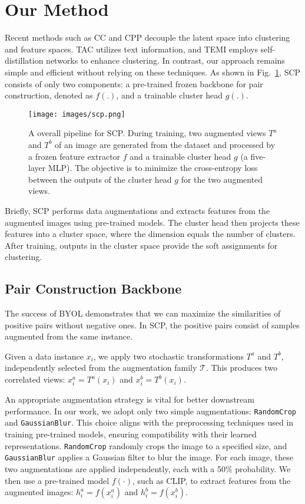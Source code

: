 \section{Our Method}
\label{sec:Our Method}
Recent methods such as CC \cite{li2021contrastive} and CPP \cite{chu2024image} decouple the latent space into clustering and feature spaces. TAC \cite{li2023image} utilizes text information, and TEMI \cite{adaloglou2023exploring} employs self-distillation networks to enhance clustering. In contrast, our approach remains simple and efficient without relying on these techniques. As shown in Fig.~\ref{fig:AE}, SCP consists of only two components: a pre-trained frozen backbone for pair construction, denoted as $f(.)$, and a trainable cluster head $g(.)$.

\begin{figure}[ht]
    \centering
    \texttt{[image: images/scp.png]}
    \caption{%
    A overall pipeline for SCP. During training, two augmented views \(T^a\) and \(T^b\) of an image are generated from the dataset and processed by a frozen feature extractor \(f\) and a trainable cluster head \(g\) (a five-layer MLP). The objective is to minimize the cross-entropy loss between the outputs of the cluster head \(g\) for the two augmented views.
    }
    \label{fig:AE}
\end{figure}

Briefly, SCP performs data augmentations and extracts features from the augmented images using pre-trained models. The cluster head then projects these features into a cluster space, where the dimension equals the number of clusters. After training, outputs in the cluster space provide the soft assignments for clustering.


\subsection{Pair Construction Backbone}

The success of BYOL demonstrates that we can maximize the similarities of positive pairs without negative ones. In SCP, the positive pairs consist of samples augmented from the same instance.

Given a data instance \(x_i\), we apply two stochastic transformations \(T^a\) and \(T^b\), independently selected from the augmentation family \(\mathcal{T}\). This produces two correlated views: \(x_i^a = T^a(x_i)\) and \(x_i^b = T^b(x_i)\). 

An appropriate augmentation strategy is vital for better downstream performance. In our work, we adopt only two simple augmentations: \texttt{RandomCrop} and \texttt{GaussianBlur}. This choice aligns with the preprocessing techniques used in training pre-trained models, ensuring compatibility with their learned representations. \texttt{RandomCrop} randomly crops the image to a specified size, and \texttt{GaussianBlur} applies a Gaussian filter to blur the image. For each image, these two augmentations are applied independently, each with a 50\% probability. We then use a pre-trained model \(f(\cdot)\), such as CLIP, to extract features from the augmented images: $h_i^a = f(x_i^a)$ and $h_i^b = f(x_i^b).$

